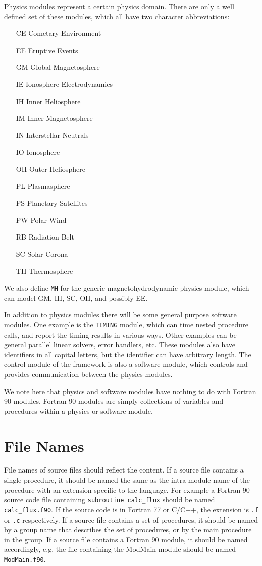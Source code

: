 Physics modules represent a certain physics domain. There are
only a well defined set of these modules, which all have two
character abbreviations:
\begin{itemize}
\item[CE]{Cometary Environment}
\item[EE]{Eruptive Events}
\item[GM]{Global Magnetosphere}
\item[IE]{Ionosphere Electrodynamics}
\item[IH]{Inner Heliosphere}
\item[IM]{Inner Magnetosphere}
\item[IN]{Interstellar Neutrals}
\item[IO]{Ionosphere}
\item[OH]{Outer Heliosphere}
\item[PL]{Plasmasphere}
\item[PS]{Planetary Satellites}
\item[PW]{Polar Wind}
\item[RB]{Radiation Belt}
\item[SC]{Solar Corona}
\item[TH]{Thermosphere}
\end{itemize}
We also define {\tt MH} for the generic magnetohydrodynamic
physics module, which can model GM, IH, SC, OH, and possibly EE.

In addition to physics modules there will be some general purpose
software modules. One example is the {\tt TIMING} module, which
can time nested procedure calls, and report the timing results
in various ways. Other examples can be general parallel linear
solvers, error handlers, etc. These modules also have identifiers
in all capital letters, but the identifier can have arbitrary
length. The control module of the framework is also a 
software module, which controls and provides communication
between the physics modules.

We note here that physics and software modules have nothing to do
with Fortran 90 modules. Fortran 90 modules are simply collections
of variables and procedures within a physics or software module.

\section{File Names}

File names of source files should reflect the content.
If a source file contains a single procedure, it
should be named the same as the intra-module name of
the procedure with an extension specific to the language.
For example a Fortran 90 source code file containing
{\tt subroutine calc\_flux} should be named
{\tt calc\_flux.f90}. If the source code is in Fortran 77 or C/C++,
the extension is {\tt .f} or {\tt .c} respectively.
If a source file contains a set of procedures,
it should be named by a group name that describes
the set of procedures, or by the main procedure in the group.
If a source file contains a Fortran 90 module, it should
be named accordingly, e.g. the file containing the ModMain module
should be named {\tt ModMain.f90}.

